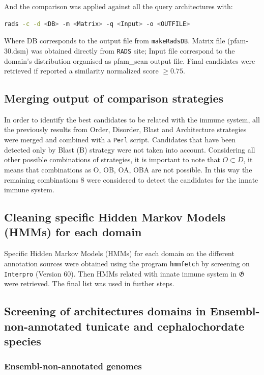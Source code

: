 \documentclass[11pt]{article}
\begin{document}
And the comparison was applied against all the query architectures with: 

\begin{lstlisting}[language=bash, breaklines=true]
rads -c -d <DB> -m <Matrix> -q <Input> -o <OUTFILE>
\end{lstlisting} 

Where DB corresponds to the output file from \texttt{makeRadsDB}. Matrix file 
(pfam-30.dsm) was obtained directly from \texttt{RADS} site; Input file 
correspond to the domain's distribution organised as pfam\_scan output 
file. Final candidates were retrieved if reported a similarity normalized score $\geq 0.75$.

\subsection*{Merging output of comparison strategies}
In order to identify the best candidates to be related with the immune 
system, all the previously results from Order, Disorder, Blast and Architecture 
strategies were merged and combined with a \texttt{Perl} script. Candidates 
that have been detected only by Blast (B) strategy were not taken into 
account. Considering all other possible combinations of strategies, it is 
important to note that $O \subset D$, it means that combinations as O, OB, OA, 
OBA are not possible. In this way the remaining combinations $8$ were 
considered to detect the candidates for the innate immune system.

\subsection*{Cleaning specific Hidden Markov Models (HMMs) for each 
domain}
Specific Hidden Markov Models (HMMs) for each domain on the different 
annotation sources were obtained using the program \texttt{hmmfetch} by 
screening on \texttt{Interpro} (Version 60). Then HMMs related with innate 
inmune system in $\boldsymbol{\mathfrak{G}}$ were retrieved. The final list was 
used in further steps.

\subsection*{Screening of architectures domains in Ensembl-non-annotated 
tunicate and cephalochordate species}

\subsubsection*{Ensembl-non-annotated genomes}
\end{document}
